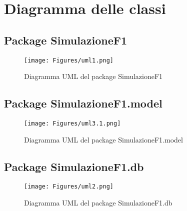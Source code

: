\chapter{Diagramma delle classi}

\section{Package SimulazioneF1}
\vspace{2cm}

\begin{figure}[h!]
    \centering
    \texttt{[image: Figures/uml1.png]}
    \caption{Diagramma UML del package SimulazioneF1}
    \label{fig:diagramma_simulazionef1}
\end{figure}
\newpage
\section{Package SimulazioneF1.model}
\vspace{1cm}
\begin{figure}[h!]
    \centering
    \texttt{[image: Figures/uml3.1.png]}
    \caption{Diagramma UML del package SimulazioneF1.model}
    \label{fig:diagramma_model}
\end{figure}
\newpage
\section{Package SimulazioneF1.db}
\vspace{2cm}
\begin{figure}[h!]
    \centering
    \texttt{[image: Figures/uml2.png]}
    \caption{Diagramma UML del package SimulazioneF1.db}
    \label{fig:diagramma_db}
\end{figure}


